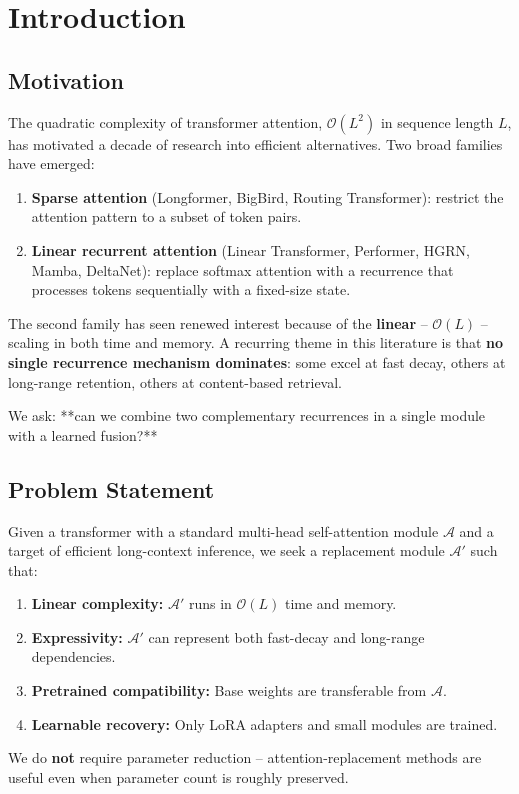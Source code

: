\section{Introduction}

\subsection{Motivation}

The quadratic complexity of transformer attention, $\mathcal{O}(L^2)$ in 
sequence length $L$, has motivated a decade of research into efficient 
alternatives. Two broad families have emerged:

\begin{enumerate}
\item \textbf{Sparse attention} (Longformer, BigBird, Routing Transformer): restrict
  the attention pattern to a subset of token pairs.
\item \textbf{Linear recurrent attention} (Linear Transformer, Performer, HGRN, Mamba,
  DeltaNet): replace softmax attention with a recurrence that processes
  tokens sequentially with a fixed-size state.

\end{enumerate}
The second family has seen renewed interest because of the \textbf{linear} -- 
$\mathcal{O}(L)$ -- scaling in both time and memory. A recurring theme in this 
literature is that \textbf{no single recurrence mechanism dominates}: some excel 
at fast decay, others at long-range retention, others at content-based 
retrieval.

We ask: **can we combine two complementary recurrences in a single module 
with a learned fusion?**

\subsection{Problem Statement}

Given a transformer with a standard multi-head self-attention module 
$\mathcal{A}$ and a target of efficient long-context inference, we seek a 
replacement module $\mathcal{A}'$ such that:

\begin{enumerate}
\item \textbf{Linear complexity:} $\mathcal{A}'$ runs in $\mathcal{O}(L)$ time and memory.
\item \textbf{Expressivity:} $\mathcal{A}'$ can represent both fast-decay and
  long-range dependencies.
\item \textbf{Pretrained compatibility:} Base weights are transferable from $\mathcal{A}$.
\item \textbf{Learnable recovery:} Only LoRA adapters and small modules are trained.

\end{enumerate}
We do \textbf{not} require parameter reduction -- attention-replacement methods 
are useful even when parameter count is roughly preserved.

